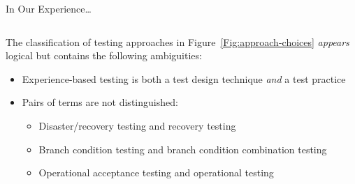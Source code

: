 \documentclass[22pt]{beamer}
\begin{document}
\begin{frame}[fragile]
\begin{textblock}{7.25}
\begin{block}{\fontsize{37}{20}\selectfont In Our Experience\dots}
\begin{columns}
\begin{column}{0.25\textwidth}
                    The classification of testing approaches in
                    Figure~\ref{Fig:approach-choices} \emph{appears} logical
                    but contains the following ambiguities:
                    \begin{itemize}
                        \item Experience-based testing is both a test design
                              technique \emph{and} a test practice
                        \item Pairs of terms are not distinguished:
                              \begin{itemize}
                                  \item Disaster/recovery testing and recovery
                                        testing
                                  \item Branch condition testing and branch
                                        condition combination testing
                                  \item Operational acceptance testing and
                                        operational testing \cite[p.~303]{IEEE2017}
                              \end{itemize}
                    \end{itemize}
                \end{column}
            \end{columns}
            \vspace{3mm}
        \end{block}
    \end{textblock}


\end{frame}
\end{document}
